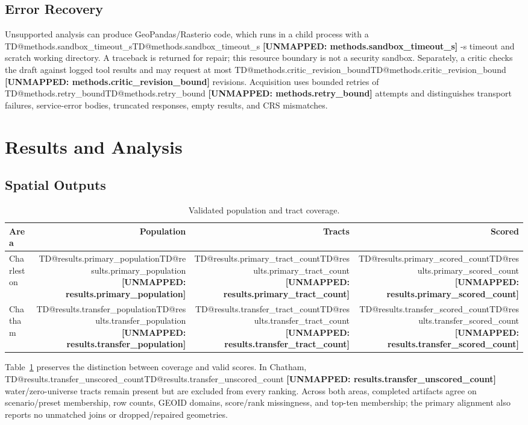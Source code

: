 \documentclass[sigconf,nonacm]{acmart}
\makeatletter
\newcommand{\TD}[1]{%
  \ifcsname TD@#1\endcsname\csname TD@#1\endcsname%
  \else\textbf{[UNMAPPED: #1]}\fi%
}
\makeatother
\begin{document}
\subsection{Error Recovery}

Unsupported analysis can produce GeoPandas/Rasterio code, which runs in a child
process with a \TD{methods.sandbox_timeout_s}-s timeout and scratch working
directory. A traceback is returned for repair; this resource boundary is not a
security sandbox. Separately, a critic checks the draft against logged tool
results and may request at most \TD{methods.critic_revision_bound} revisions.
Acquisition uses bounded retries of \TD{methods.retry_bound} attempts and
distinguishes transport failures, service-error bodies, truncated responses,
empty results, and CRS mismatches.

\section{Results and Analysis}

\subsection{Spatial Outputs}

\begin{table}[t]
  \caption{Validated population and tract coverage.}
  \label{tab:coverage}
  \centering
  \small
  \begin{tabular}{lrrr}
    \toprule
    Area & Population & Tracts & Scored \\
    \midrule
    Charleston & \TD{results.primary_population} &
      \TD{results.primary_tract_count} & \TD{results.primary_scored_count} \\
    Chatham & \TD{results.transfer_population} &
      \TD{results.transfer_tract_count} & \TD{results.transfer_scored_count} \\
    \bottomrule
  \end{tabular}
\end{table}

Table~\ref{tab:coverage} preserves the distinction between coverage and valid
scores. In Chatham, \TD{results.transfer_unscored_count} water/zero-universe
tracts remain present but are excluded from every ranking. Across both areas,
completed artifacts agree on scenario/preset membership, row counts, GEOID
domains, score/rank missingness, and top-ten membership; the primary alignment
also reports no unmatched joins or dropped/repaired geometries.
\end{document}

